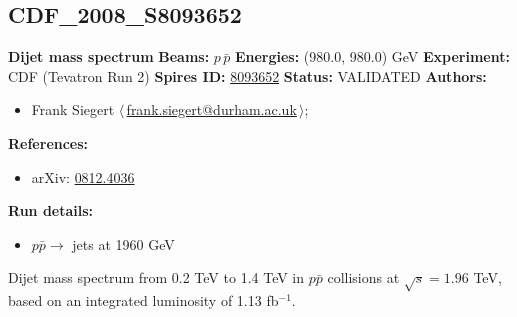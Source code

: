 \clearpage


\clearpage

\subsection[CDF\_2008\_S8093652]{CDF\_2008\_S8093652\,\cite{Aaltonen:2008dn}}
\textbf{Dijet mass spectrum}\newline
\textbf{Beams:} $p$\,$\bar{p}$ \newline
\textbf{Energies:} (980.0, 980.0) GeV \newline
\textbf{Experiment:} CDF (Tevatron Run 2) \newline
\textbf{Spires ID:} \href{http://www.slac.stanford.edu/spires/find/hep/www?rawcmd=key+8093652}{8093652}\newline
\textbf{Status:} VALIDATED\newline
\textbf{Authors:}
\begin{itemize}
  \item Frank Siegert $\langle\,$\href{mailto:frank.siegert@durham.ac.uk}{frank.siegert@durham.ac.uk}$\,\rangle$;
\end{itemize}
\textbf{References:}
\begin{itemize}
  \item arXiv: \href{http://arxiv.org/abs/0812.4036}{0812.4036}
\end{itemize}
\textbf{Run details:}
\begin{itemize}

  \item $p \bar{p} \to$ jets at 1960 GeV\end{itemize}

\noindent Dijet mass spectrum  from 0.2 TeV to 1.4 TeV in $p \bar{p}$ collisions at $\sqrt{s} = 1.96$ TeV, based on an integrated luminosity of 1.13 fb$^{-1}$.

\clearpage


\clearpage

